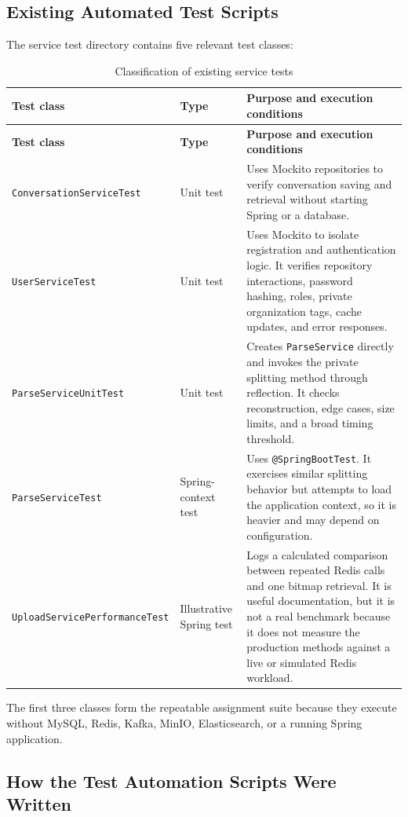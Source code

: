 \documentclass[11pt,a4paper]{article}
\begin{document}
\subsection{Existing Automated Test Scripts}

The service test directory contains five relevant test classes:

\begin{longtable}{@{}p{}p{}p{}@{}}
\caption{Classification of existing service tests}\\
\toprule
\textbf{Test class} & \textbf{Type} & \textbf{Purpose and execution conditions} \\
\midrule
\endfirsthead
\toprule
\textbf{Test class} & \textbf{Type} & \textbf{Purpose and execution conditions} \\
\midrule
\endhead
\texttt{ConversationServiceTest} &
Unit test &
Uses Mockito repositories to verify conversation saving and retrieval without starting
Spring or a database. \\
\texttt{UserServiceTest} &
Unit test &
Uses Mockito to isolate registration and authentication logic. It verifies repository
interactions, password hashing, roles, private organization tags, cache updates, and
error responses. \\
\texttt{ParseServiceUnitTest} &
Unit test &
Creates \texttt{ParseService} directly and invokes the private splitting method through
reflection. It checks reconstruction, edge cases, size limits, and a broad timing
threshold. \\
\texttt{ParseServiceTest} &
Spring-context test &
Uses \texttt{@SpringBootTest}. It exercises similar splitting behavior but attempts to
load the application context, so it is heavier and may depend on configuration. \\
\texttt{UploadServicePerformanceTest} &
Illustrative Spring test &
Logs a calculated comparison between repeated Redis calls and one bitmap retrieval.
It is useful documentation, but it is not a real benchmark because it does not measure
the production methods against a live or simulated Redis workload. \\
\bottomrule
\end{longtable}

The first three classes form the repeatable assignment suite because they execute
without MySQL, Redis, Kafka, MinIO, Elasticsearch, or a running Spring application.

\subsection{How the Test Automation Scripts Were Written}
\end{document}
